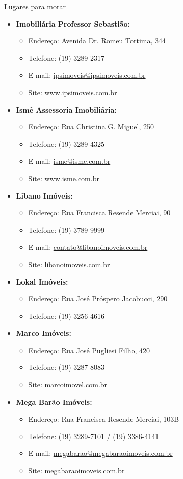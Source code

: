 \begin{story}{Lugares para morar}
\begin{itemize}
\item \textbf{Imobiliária Professor Sebastião:}
\begin{itemize}
\item Endereço: Avenida Dr. Romeu Tortima, 344
\item Telefone: (19) 3289-2317
\item E-mail: \url{ipsimoveis@ipsimoveis.com.br}
\item Site: \url{www.ipsimoveis.com.br}
\end{itemize}

\item \textbf{Ismê Assessoria Imobiliária:}
\begin{itemize}
\item Endereço: Rua Christina G. Miguel, 250
\item Telefone: (19) 3289-4325
\item E-mail: \url{isme@isme.com.br}
\item Site: \url{www.isme.com.br}
\end{itemize}

\item \textbf{Libano Imóveis:}
\begin{itemize}
\item Endereço: Rua Francisca Resende Merciai, 90
\item Telefone: (19) 3789-9999
\item E-mail: \url{contato@libanoimoveis.com.br}
\item Site: \url{libanoimoveis.com.br}
\end{itemize}

\item \textbf{Lokal Imóveis:}
\begin{itemize}
\item Endereço: Rua José Próspero Jacobucci, 290
\item Telefone: (19) 3256-4616
\end{itemize}

\item \textbf{Marco Imóveis:}
\begin{itemize}
\item Endereço: Rua José Pugliesi Filho, 420
\item Telefone: (19) 3287-8083
\item Site: \url{marcoimovel.com.br}
\end{itemize}

\item \textbf{Mega Barão Imóveis:}
\begin{itemize}
\item Endereço: Rua Francisca Resende Merciai, 103B
\item Telefone: (19) 3289-7101 / (19) 3386-4141
\item E-mail: \url{megabarao@megabaraoimoveis.com.br}
\item Site: \url{megabaraoimoveis.com.br}
\end{itemize}


\end{itemize}
\end{story}
